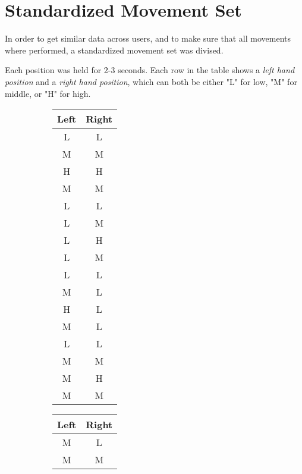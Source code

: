 \chapter{Standardized Movement Set}
\label{appendix: standardized movement set}

In order to get similar data across users, and to make sure that all movements where performed, a standardized movement set was divised.

Each position was held for 2-3 seconds. 
Each row in the table shows a \textit{left hand position} and a \textit{right hand position}, which can both be either "L" for low, "M" for middle, or "H" for high.

\begin{figure}[h]
    \centering
    \begin{subfigure}[t]{0.2\textwidth}
    \centering
    \begin{tabular}[t]{||c|c||}
    \hline
    Left & Right\\
    \hline \hline
      L  & L\\
      \hline
      M  &M\\
      \hline
      H & H\\ 
      \hline
      M & M\\ 
      \hline
      L & L\\ 
      \hline
      L & M\\ 
      \hline
      L & H\\ 
      \hline
      L & M\\ 
      \hline
      L & L\\ 
      \hline
      M & L\\
      \hline
      H & L \\
      \hline
      M & L \\
      \hline
      L & L \\
      \hline
      M & M \\
      \hline
      M & H \\
      \hline
      M & M \\
      \hline
    \end{tabular}
    \end{subfigure}
    \begin{subfigure}[t]{0.2\textwidth}
    \centering
    \begin{tabular}[t]{||c|c||}
    \hline
    Left & Right\\
    \hline \hline
      M & L \\
      \hline
      M & M \\

\end{tabular}
\end{subfigure}
\end{figure}
